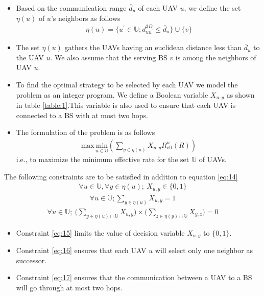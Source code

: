\documentclass{beamer}
\begin{document}
\begin{frame}{}
\begin{itemize}
\item Based on the communication range $\bar{d}_{u}$ of each UAV $u$, we define the set $\eta(u)$ of $u$'s neighbors as follows
  \begin{align}
      \eta(u) = \{u^\prime \in \mathbb{U};d^{3D}_{uu^\prime} \leq \bar{d}_{u}\} \cup \{v\}\label{eq:13}
  \end{align} 
 \item The set $\eta(u)$ gathers the UAVs having an euclidean distance less than $ \bar{d}_{u}$ to the UAV $u$. We also assume that the serving BS $v$ is among the neighbors of UAV $u$.
 \item To find the optimal strategy to be selected by each UAV we model the problem as an integer program. We define a Boolean variable $X_{u,y}$ as shown in table \ref{table:1}.This variable is also used to ensure that each UAV is connected to a BS with at most two hops.
 \item The formulation of the problem is as follows
 \begin{align}
 \text{max}\, \underset{u\in \mathbb{U}}{\text{min}}(\sum_{y\in \eta(u)}X_{u,y}R^{u}_{\text{eff}}(R))\label{eq:14}
 \end{align}
 i.e., to maximize the minimum effective rate for the set $\mathbb{U}$ of UAVs.
 \end{itemize}
 \end{frame}

\begin{frame}{}
The following constraints are to be satisfied in addition to equation \eqref{eq:14} 
\begin{align}
 \forall{u} \in \mathbb{U},\forall{y} \in \eta(u);\ X_{u,y} \in \{0,1\}\label{eq:15}
 \end{align}
\begin{align}
   \forall{u} \in \mathbb{U};\sum_{y\in \eta(u)}X_{u,y} = 1\label{eq:16}
\end{align}  
\begin{align}
    \forall{u} \in \mathbb{U};\ \Bigg(\sum_{y \in \eta(u) \cap \mathbb{U}}X_{u,y}\Bigg) \times \Bigg(\sum_{z \in \eta(y) \cap \mathbb{U}}X_{y,z}\Bigg) = 0\label{eq:17}
\end{align}
\begin{itemize}
    \item Constraint \eqref{eq:15} limits the value of decision variable $X_{u,y}$ to $\{0,1\}$.
    \item Constraint \eqref{eq:16} ensures that each UAV $u$ will select only one neighbor as successor.
    \item Constraint \eqref{eq:17} ensures that the communication between a UAV to a BS will go through at most two hops.
\end{itemize}
\end{frame}
\end{document}
